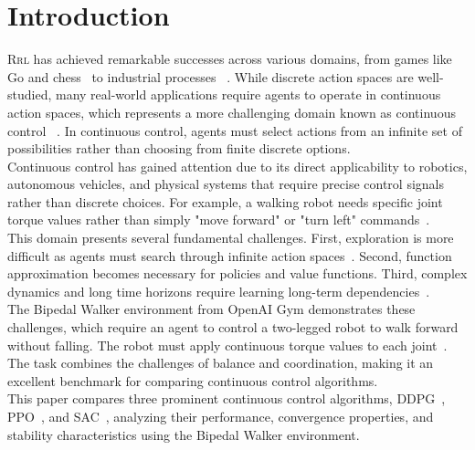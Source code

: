 \section{Introduction}

\lettrine[nindent=0em,lines=3]{R} \MakeLowercase{\gls{RL}} has achieved remarkable successes across various domains, from games like Go and chess~\cite{doi:10.1126/science.aar6404} to industrial processes ~\cite{NEURIPS2018_059fdcd9}. While discrete action spaces are well-studied, many real-world applications require agents to operate in continuous action spaces, which represents a more challenging domain known as continuous control ~\cite{lillicrap2019continuouscontroldeepreinforcement}. In continuous control, agents must select actions from an infinite set of possibilities rather than choosing from finite discrete options.\\

\noindent Continuous control has gained attention due to its direct applicability to robotics, autonomous vehicles, and physical systems that require precise control signals rather than discrete choices. For example, a walking robot needs specific joint torque values rather than simply "move forward" or "turn left" commands~\cite{lillicrap2019continuouscontroldeepreinforcement}.\\

\noindent This domain presents several fundamental challenges. First, exploration is more difficult as agents must search through infinite action spaces~\cite{duan2016benchmarkingdeepreinforcementlearning}. Second, function approximation becomes necessary for policies and value functions. Third, complex dynamics and long time horizons require learning long-term dependencies~\cite{lillicrap2019continuouscontroldeepreinforcement}.\\

\noindent The Bipedal Walker environment from OpenAI Gym demonstrates these challenges, which require an agent to control a two-legged robot to walk forward without falling. The robot must apply continuous torque values to each joint~\cite{openai2021bipedalwalker}. The task combines the challenges of balance and coordination, making it an excellent benchmark for comparing continuous control algorithms.\\

\noindent This paper compares three prominent continuous control algorithms, \gls{DDPG}~\cite{lillicrap2019continuouscontroldeepreinforcement}, \gls{PPO}~\cite{schulman2017proximalpolicyoptimizationalgorithms}, and \gls{SAC}~\cite{haarnoja2018softactorcriticoffpolicymaximum}, analyzing their performance, convergence properties, and stability characteristics using the Bipedal Walker environment.